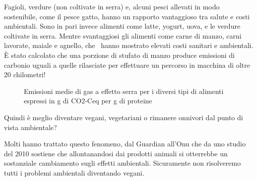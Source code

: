\documentclass[12pt]{book} %
\begin{document}
\bigskip

Fagioli, verdure (non coltivate in serra) e, alcuni pesci allevati in modo sostenibile, come il pesce gatto, hanno un
rapporto vantaggioso tra salute e costi ambientali. Sono in pari invece alimenti come latte, yogurt, uova, e le verdure
coltivate in serra. Mentre svantaggiosi gli alimenti come carne di manzo, carni lavorate, maiale e agnello, che \ hanno
mostrato elevati costi sanitari e ambientali. È stato calcolato che una porzione di stufato di manzo produce emissioni
di carbonio uguali a quelle rilasciate per effettuare un percorso in macchina di oltre 20 chilometri!


\bigskip

\begin{figure}[H]
\centering
{}
\caption{Emissioni medie di gas a effetto serra per i diversi tipi di alimenti espressi in g di CO2-Ceq per g di proteine}
\end{figure}

\bigskip

Quindi è meglio diventare vegani, vegetariani o rimanere onnivori dal punto di vista ambientale?

Molti hanno trattato questo fenomeno, dal
Guardian
all'Onu che da uno studio del 2010 sostiene che allontanandosi dai prodotti animali si otterrebbe un sostanziale cambiamento
sugli effetti ambientali. Sicuramente non risolveremo tutti i problemi ambientali diventando vegani.
\end{document}
